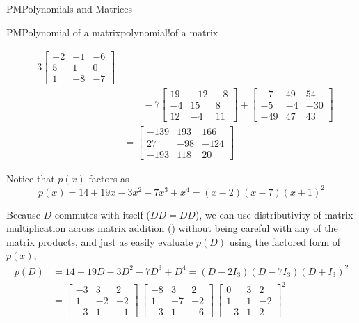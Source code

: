 \begin{subsect}{PM}{Polynomials and Matrices}
\begin{example}{PM}{Polynomial of a matrix}{polynomial!of a matrix}
\begin{para}
\begin{align*}
   -3\begin{bmatrix}-2 & -1 & -6\\5 & 1 & 0\\1 & -8 & -7\end{bmatrix}\\
&\quad\quad
   -7\begin{bmatrix}19 & -12 & -8\\-4 & 15 & 8\\12 & -4 & 11\end{bmatrix}
    +\begin{bmatrix}-7 & 49 & 54\\-5 & -4 & -30\\-49 & 47 & 43\end{bmatrix}\\
&=
\begin{bmatrix}
-139 & 193 & 166\\
27 & -98 & -124\\
-193 & 118 & 20
\end{bmatrix}
\end{align*}
\end{para}
%
\begin{para}Notice that $p(x)$ factors as
%
\begin{equation*}
p(x)=14+19x-3x^2-7x^3+x^4=(x-2)(x-7)(x+1)^2
\end{equation*}
\end{para}
%
\begin{para}Because $D$ commutes with itself ($DD=DD$), we can use distributivity of matrix multiplication across matrix addition () without being careful with any of the matrix products, and just as easily evaluate $p(D)$ using the factored form of $p(x)$,
%
\begin{align*}
p(D)&=14+19D-3D^2-7D^3+D^4=(D-2I_3)(D-7I_3)(D+I_3)^2\\
&=
\begin{bmatrix}
-3 & 3 & 2\\ 1 & -2 & -2\\ -3 & 1 & -1
\end{bmatrix}\,
\begin{bmatrix}
-8 & 3 & 2\\ 1 & -7 & -2\\ -3 & 1 & -6
\end{bmatrix}\,
\begin{bmatrix}
0 & 3 & 2\\ 1 & 1 & -2\\ -3 & 1 & 2
\end{bmatrix}^2\\

\end{align*}
\end{para}
\end{example}
\end{subsect}
